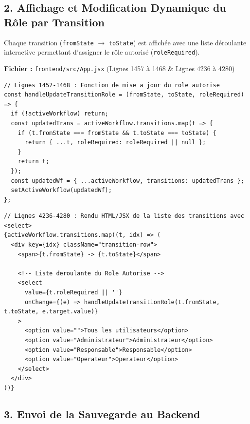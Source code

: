 \documentclass[11pt,a4paper]{article}
\begin{document}
\subsection{2. Affichage et Modification Dynamique du Rôle par Transition}
Chaque transition (\texttt{fromState} $\rightarrow$ \texttt{toState}) est affichée avec une liste déroulante interactive permettant d'assigner le rôle autorisé (\texttt{roleRequired}).

\begin{codebox}[title=Localisation dans le Code :]
\textbf{Fichier :} \small\texttt{frontend/src/App.jsx} (Lignes 1457 à 1468 \& Lignes 4236 à 4280)
\end{codebox}

\begin{lstlisting}[language=CustomJava, caption={Mise a jour dynamique de l'etat local dans App.jsx}]
// Lignes 1457-1468 : Fonction de mise a jour du role autorise
const handleUpdateTransitionRole = (fromState, toState, roleRequired) => {
  if (!activeWorkflow) return;
  const updatedTrans = activeWorkflow.transitions.map(t => {
    if (t.fromState === fromState && t.toState === toState) {
      return { ...t, roleRequired: roleRequired || null };
    }
    return t;
  });
  const updatedWf = { ...activeWorkflow, transitions: updatedTrans };
  setActiveWorkflow(updatedWf);
};
\end{lstlisting}

\begin{lstlisting}[language=CustomJava, caption={Rendu JSX de la liste deroulante de role par transition dans App.jsx}]
// Lignes 4236-4280 : Rendu HTML/JSX de la liste des transitions avec <select>
{activeWorkflow.transitions.map((t, idx) => (
  <div key={idx} className="transition-row">
    <span>{t.fromState} -> {t.toState}</span>
    
    <!-- Liste deroulante du Role Autorise -->
    <select
      value={t.roleRequired || ''}
      onChange={(e) => handleUpdateTransitionRole(t.fromState, t.toState, e.target.value)}
    >
      <option value="">Tous les utilisateurs</option>
      <option value="Administrateur">Administrateur</option>
      <option value="Responsable">Responsable</option>
      <option value="Operateur">Operateur</option>
    </select>
  </div>
))}
\end{lstlisting}

\subsection{3. Envoi de la Sauvegarde au Backend}
\end{document}
